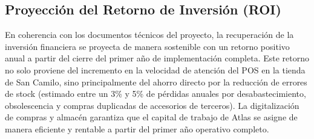 \subsection{Proyección del Retorno de Inversión (ROI)}
\begin{indentedsubsection}
En coherencia con los documentos técnicos del proyecto, la recuperación de la inversión financiera se proyecta de manera sostenible con un retorno positivo anual a partir del cierre del primer año de implementación completa. Este retorno no solo proviene del incremento en la velocidad de atención del POS en la tienda de San Camilo, sino principalmente del ahorro directo por la reducción de errores de stock (estimado entre un 3\% y 5\% de pérdidas anuales por desabastecimiento, obsolescencia y compras duplicadas de accesorios de terceros). La digitalización de compras y almacén garantiza que el capital de trabajo de Atlas se asigne de manera eficiente y rentable a partir del primer año operativo completo.
\end{indentedsubsection}

